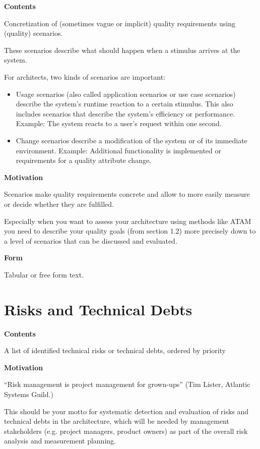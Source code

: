 \documentclass[
]{article}
\begin{document}
\textbf{Contents}

Concretization of (sometimes vague or implicit) quality requirements
using (quality) scenarios.

These scenarios describe what should happen when a stimulus arrives at
the system.

For architects, two kinds of scenarios are important:

\begin{itemize}
\item
  Usage scenarios (also called application scenarios or use case
  scenarios) describe the system's runtime reaction to a certain
  stimulus. This also includes scenarios that describe the system's
  efficiency or performance. Example: The system reacts to a user's
  request within one second.
\item
  Change scenarios describe a modification of the system or of its
  immediate environment. Example: Additional functionality is
  implemented or requirements for a quality attribute change.
\end{itemize}

\textbf{Motivation}

Scenarios make quality requirements concrete and allow to more easily
measure or decide whether they are fulfilled.

Especially when you want to assess your architecture using methods like
ATAM you need to describe your quality goals (from section 1.2) more
precisely down to a level of scenarios that can be discussed and
evaluated.

\textbf{Form}

Tabular or free form text.

\hypertarget{section-technical-risks}{%
\section{Risks and Technical Debts}\label{section-technical-risks}}

\textbf{Contents}

A list of identified technical risks or technical debts, ordered by
priority

\textbf{Motivation}

``Risk management is project management for grown-ups'' (Tim Lister,
Atlantic Systems Guild.)

This should be your motto for systematic detection and evaluation of
risks and technical debts in the architecture, which will be needed by
management stakeholders (e.g. project managers, product owners) as part
of the overall risk analysis and measurement planning.
\end{document}
